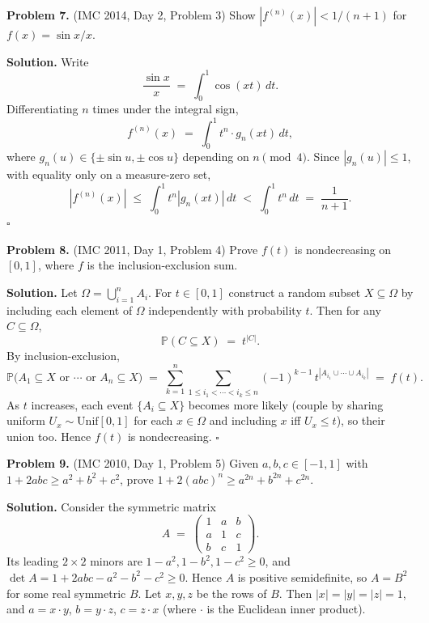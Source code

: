 \documentclass{article}
\begin{document}
\bigskip
\textbf{Problem 7.} (IMC 2014, Day 2, Problem 3)
Show \( |f^{(n)}(x)| < 1/(n+1) \) for \( f(x) = \sin x / x \).

\textbf{Solution.}
Write
\[
\frac{\sin x}{x} \;=\; \int_0^1 \cos(xt)\, dt.
\]
Differentiating \( n \) times under the integral sign,
\[
f^{(n)}(x) \;=\; \int_0^1 t^n \cdot g_n(xt)\, dt,
\]
where \( g_n(u) \in \{ \pm \sin u, \pm \cos u \} \) depending on \( n \pmod 4 \). Since \( |g_n(u)| \leq 1 \), with equality only on a measure-zero set,
\[
|f^{(n)}(x)| \;\leq\; \int_0^1 t^n |g_n(xt)|\, dt \;<\; \int_0^1 t^n\, dt \;=\; \frac{1}{n+1}.
\]
\hfill\(\square\)

\bigskip
\textbf{Problem 8.} (IMC 2011, Day 1, Problem 4)
Prove \( f(t) \) is nondecreasing on \( [0, 1] \), where \( f \) is the inclusion-exclusion sum.

\textbf{Solution.}
Let \( \Omega = \bigcup_{i=1}^n A_i \). For \( t \in [0, 1] \) construct a random subset \( X \subseteq \Omega \) by including each element of \( \Omega \) independently with probability \( t \). Then for any \( C \subseteq \Omega \),
\[
\mathbb{P}(C \subseteq X) \;=\; t^{|C|}.
\]
By inclusion-exclusion,
\[
\mathbb{P}\bigl( A_1 \subseteq X \text{ or } \cdots \text{ or } A_n \subseteq X \bigr) \;=\; \sum_{k=1}^n \sum_{1 \leq i_1 < \cdots < i_k \leq n} (-1)^{k-1}\, t^{|A_{i_1} \cup \cdots \cup A_{i_k}|} \;=\; f(t).
\]
As \( t \) increases, each event \( \{ A_i \subseteq X \} \) becomes more likely (couple by sharing uniform \( U_x \sim \mathrm{Unif}[0,1] \) for each \( x \in \Omega \) and including \( x \) iff \( U_x \leq t \)), so their union too. Hence \( f(t) \) is nondecreasing. \hfill\(\square\)

\bigskip
\textbf{Problem 9.} (IMC 2010, Day 1, Problem 5)
Given \( a, b, c \in [-1, 1] \) with \( 1 + 2abc \geq a^2 + b^2 + c^2 \), prove \( 1 + 2(abc)^n \geq a^{2n} + b^{2n} + c^{2n} \).

\textbf{Solution.}
Consider the symmetric matrix
\[
A \;=\; \begin{pmatrix} 1 & a & b \\ a & 1 & c \\ b & c & 1 \end{pmatrix}.
\]
Its leading \( 2 \times 2 \) minors are \( 1 - a^2, 1 - b^2, 1 - c^2 \geq 0 \), and \( \det A = 1 + 2abc - a^2 - b^2 - c^2 \geq 0 \). Hence \( A \) is positive semidefinite, so \( A = B^2 \) for some real symmetric \( B \). Let \( x, y, z \) be the rows of \( B \). Then \( |x| = |y| = |z| = 1 \), and \( a = x \cdot y \), \( b = y \cdot z \), \( c = z \cdot x \) (where \( \cdot \) is the Euclidean inner product).
\end{document}

